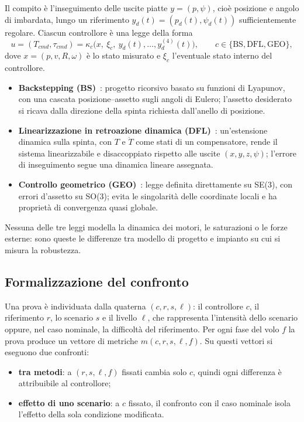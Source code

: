 \documentclass[11pt,a4paper]{article}
\begin{document}
Il compito è l'inseguimento delle uscite piatte $y = (p, \psi)$, cioè posizione e angolo di imbardata, lungo un riferimento $y_d(t) = (p_d(t), \psi_d(t))$ sufficientemente regolare. Ciascun controllore è una legge della forma
\begin{equation}
u = (T_{cmd}, \tau_{cmd}) = \kappa_c\big(x,\ \xi_c,\ y_d(t), \dots, y_d^{(4)}(t)\big), \qquad c \in \{\text{BS}, \text{DFL}, \text{GEO}\},
\end{equation}
dove $x = (p, v, R, \omega)$ è lo stato misurato e $\xi_c$ l'eventuale stato interno del controllore.
\begin{itemize}
  \item \textbf{Backstepping (BS)}~\cite{slide,madani,bouabdallah}: progetto ricorsivo basato su funzioni di Lyapunov, con una cascata posizione--assetto sugli angoli di Eulero; l'assetto desiderato si ricava dalla direzione della spinta richiesta dall'anello di posizione.
  \item \textbf{Linearizzazione in retroazione dinamica (DFL)}~\cite{slide}: un'estensione dinamica sulla spinta, con $T$ e $\dot T$ come stati di un compensatore, rende il sistema linearizzabile e disaccoppiato rispetto alle uscite $(x, y, z, \psi)$; l'errore di inseguimento segue una dinamica lineare assegnata.
  \item \textbf{Controllo geometrico (GEO)}~\cite{slide,lee}: legge definita direttamente su SE(3), con errori d'assetto su SO(3); evita le singolarità delle coordinate locali e ha proprietà di convergenza quasi globale.
\end{itemize}
Nessuna delle tre leggi modella la dinamica dei motori, le saturazioni o le forze esterne: sono queste le differenze tra modello di progetto e impianto su cui si misura la robustezza.

\subsection{Formalizzazione del confronto}

Una prova è individuata dalla quaterna $(c, r, s, \ell)$: il controllore $c$, il riferimento $r$, lo scenario $s$ e il livello $\ell$, che rappresenta l'intensità dello scenario oppure, nel caso nominale, la difficoltà del riferimento. Per ogni fase del volo $f$ la prova produce un vettore di metriche $m(c, r, s, \ell, f)$. Su questi vettori si eseguono due confronti:
\begin{itemize}
  \item \textbf{tra metodi}: a $(r, s, \ell, f)$ fissati cambia solo $c$, quindi ogni differenza è attribuibile al controllore;
  \item \textbf{effetto di uno scenario}: a $c$ fissato, il confronto con il caso nominale isola l'effetto della sola condizione modificata.
\end{itemize}
\end{document}
